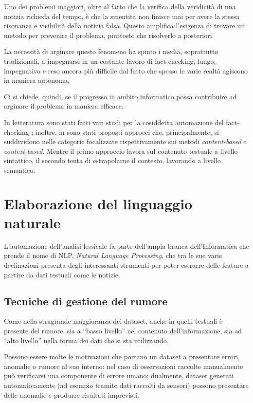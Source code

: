 \documentclass[12pt]{report}
\theoremstyle{definition}
\begin{document}
Uno dei problemi maggiori, oltre al fatto che la verifica della veridicità di una notizia richieda del tempo, è che la smentita non finisce mai per avere la stessa risonanza e visibilità della notizia falsa. Questo amplifica l'esigenza di trovare un metodo per prevenire il problema, piuttosto che risolverlo a posteriori.

La necessità di arginare questo fenomeno ha spinto i media, soprattutto tradizionali, a impegnarsi in un costante lavoro di fact-checking, lungo, impegnativo e reso ancora più difficile dal fatto che spesso le varie realtà agiscono in maniera autonoma.

Ci si chiede, quindi, se il progresso in ambito informatico possa contribuire ad arginare il problema in maniera efficace.

In letteratura sono stati fatti vari studi per la cosiddetta automazione del fact-checking \cite{5, 6, 8, 9, 10, 11}; inoltre, in \cite{15, 16, 21} sono stati proposti approcci che, principalmente, si suddividono nelle categorie focalizzate rispettivamente sui metodi \textit{content-based} e \textit{context-based}.
Mentre il primo approccio lavora sul contenuto testuale a livello sintattico, il secondo tenta di estrapolarne il contesto, lavorando a livello semantico.

\section{Elaborazione del linguaggio naturale} \label{nlp}
L'automazione dell'analisi lessicale fa parte dell'ampia branca dell'Informatica che prende il nome di NLP, \textit{Natural Language Processing}, che tra le sue varie declinazioni presenta degli interessanti strumenti per poter estrarre delle feature a partire da dati testuali come le notizie.


\subsection{Tecniche di gestione del rumore} \label{clean}
Come nella stragrande maggioranza dei dataset, anche in quelli testuali è presente del rumore, sia a ``basso livello'' nel contenuto dell'informazione, sia ad ``alto livello'' nella forma dei dati che si sta utilizzando.

Possono essere molte le motivazioni che portano un dataset a presentare errori, anomalie o rumore al suo interno: 
nel caso di osservazioni raccolte manualmente può verificarsi una componente di errore umano; dualmente, dataset generati automaticamente (ad esempio tramite dati raccolti da sensori) possono presentare delle anomalie e produrre risultati imprevisti.
\end{document}
